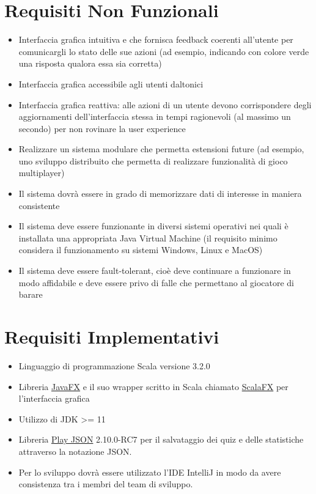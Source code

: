 	\section{Requisiti Non Funzionali}
        \begin{itemize}
            \item Interfaccia grafica intuitiva e che fornisca feedback coerenti all'utente per comunicargli lo stato delle sue azioni (ad esempio, indicando con colore verde una risposta qualora essa sia corretta)
            \item Interfaccia grafica accessibile agli utenti daltonici
            \item Interfaccia grafica reattiva: alle azioni di un utente devono corrispondere degli aggiornamenti dell'interfaccia stessa in tempi ragionevoli (al massimo un secondo) per non rovinare la user experience
            
            \item Realizzare un sistema modulare che permetta estensioni future (ad esempio, uno sviluppo distribuito che permetta di realizzare funzionalità di gioco multiplayer)
            
            \item Il sistema dovrà essere in grado di memorizzare dati di interesse in maniera consistente
            
            \item Il sistema deve essere funzionante in diversi sistemi operativi nei quali è installata una appropriata Java Virtual Machine (il requisito minimo considera il funzionamento su sistemi Windows, Linux e MacOS)
            
            \item Il sistema deve essere fault-tolerant, cioè deve continuare a funzionare in modo affidabile e deve essere privo di falle che permettano al giocatore di barare
        
        \end{itemize}

\section{Requisiti Implementativi}
        \begin{itemize}
            \item Linguaggio di programmazione Scala versione 3.2.0
            \item Libreria \href{https://openjfx.io}{JavaFX} e il suo wrapper scritto in Scala chiamato \href{https://github.com/scalafx/scalafx}{ScalaFX} per l'interfaccia grafica
            \item Utilizzo di JDK >= 11
            \item Libreria \href{https://github.com/playframework/play-json}{Play JSON} 2.10.0-RC7 per il salvataggio dei quiz e delle statistiche attraverso la notazione JSON.
            \item Per lo sviluppo dovrà essere utilizzato l'IDE IntelliJ in modo da avere consistenza tra i membri del team di sviluppo.
        \end{itemize}

	